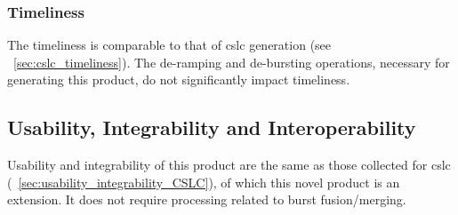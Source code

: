 \subsubsection{Timeliness}
The timeliness is comparable to that of \acs{cslc} generation (see \textsection~\ref{sec:cslc_timeliness}). The de-ramping and de-bursting operations, necessary for generating this product, do not significantly impact timeliness.

\subsection{Usability, Integrability and Interoperability}
Usability and integrability of this product are the same as those collected for \acs{cslc} (\textsection~\ref{sec:usability_integrability_CSLC}), of which this novel product is an extension. It does not require processing related to burst fusion/merging.
